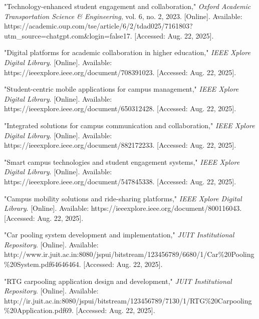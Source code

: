\documentclass[conference]{IEEEtran}
\begin{document}
\begin{thebibliography}{99}
 "Technology-enhanced student engagement and collaboration," \emph{Oxford Academic Transportation Science \& Engineering}, vol. 6, no. 2, 2023. [Online]. Available: https://academic.oup.com/tse/article/6/2/tdad025/7161803?utm\_source=chatgpt.com\&login=false17. [Accessed: Aug. 22, 2025].

 "Digital platforms for academic collaboration in higher education," \emph{IEEE Xplore Digital Library}. [Online]. Available: https://ieeexplore.ieee.org/document/708391023. [Accessed: Aug. 22, 2025].

 "Student-centric mobile applications for campus management," \emph{IEEE Xplore Digital Library}. [Online]. Available: https://ieeexplore.ieee.org/document/650312428. [Accessed: Aug. 22, 2025].

 "Integrated solutions for campus communication and collaboration," \emph{IEEE Xplore Digital Library}. [Online]. Available: https://ieeexplore.ieee.org/document/882172233. [Accessed: Aug. 22, 2025].

 "Smart campus technologies and student engagement systems," \emph{IEEE Xplore Digital Library}. [Online]. Available: https://ieeexplore.ieee.org/document/547845338. [Accessed: Aug. 22, 2025].

 "Campus mobility solutions and ride-sharing platforms," \emph{IEEE Xplore Digital Library}. [Online]. Available: https://ieeexplore.ieee.org/document/800116043. [Accessed: Aug. 22, 2025].

 "Car pooling system development and implementation," \emph{JUIT Institutional Repository}. [Online]. Available: http://www.ir.juit.ac.in:8080/jspui/bitstream/123456789/6680/1/Car\%20Pooling\%20System.pdf64646464. [Accessed: Aug. 22, 2025].

 "RTG carpooling application design and development," \emph{JUIT Institutional Repository}. [Online]. Available: http://ir.juit.ac.in:8080/jspui/bitstream/123456789/7130/1/RTG\%20Carpooling\%20Application.pdf69. [Accessed: Aug. 22, 2025].
\end{thebibliography}
\end{document}
